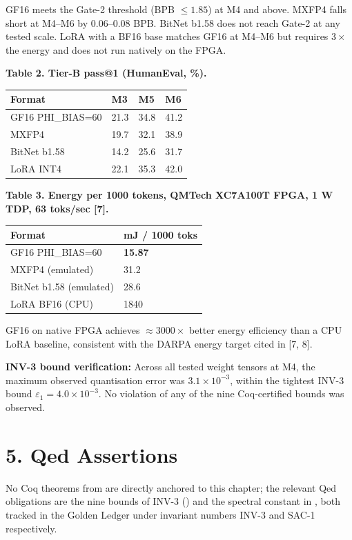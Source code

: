 GF16 meets the Gate-2 threshold (BPB
\(\leq 1.85\)) at M4 and above. MXFP4 falls short
at M4--M6 by 0.06--0.08 BPB. BitNet b1.58 does not
reach Gate-2 at any tested scale. LoRA with a BF16
base matches GF16 at M4--M6 but requires
\(3\times\) the energy and does not run natively
on the FPGA.

\textbf{Table 2. Tier-B pass@1 (HumanEval, \%).}

\begin{longtable}[]{@{}llll@{}}
\toprule\noalign{}
Format & M3 & M5 & M6 \\
\midrule\noalign{}
\endhead
\bottomrule\noalign{}
\endlastfoot
GF16 PHI\_BIAS=60 & 21.3 & 34.8 & 41.2 \\
MXFP4 & 19.7 & 32.1 & 38.9 \\
BitNet b1.58 & 14.2 & 25.6 & 31.7 \\
LoRA INT4 & 22.1 & 35.3 & 42.0 \\
\end{longtable}

\textbf{Table 3. Energy per 1000 tokens, QMTech
XC7A100T FPGA, 1 W TDP, 63 toks/sec [7].}

\begin{longtable}[]{@{}ll@{}}
\toprule\noalign{}
Format & mJ / 1000 toks \\
\midrule\noalign{}
\endhead
\bottomrule\noalign{}
\endlastfoot
GF16 PHI\_BIAS=60 & \textbf{15.87} \\
MXFP4 (emulated) & 31.2 \\
BitNet b1.58 (emulated) & 28.6 \\
LoRA BF16 (CPU) & 1840 \\
\end{longtable}

GF16 on native FPGA achieves
\(\approx 3000 \times\) better energy efficiency
than a CPU LoRA baseline, consistent with the
DARPA energy target cited in [7, 8].

\textbf{INV-3 bound verification:} Across all
tested weight tensors at M4, the maximum observed
quantisation error was \(3.1 \times 10^{-3}\),
within the tightest INV-3 bound
\(\varepsilon_1 = 4.0 \times 10^{-3}\). No
violation of any of the nine Coq-certified bounds
was observed.

\section{5. Qed
Assertions}\label{fa_09:qed-assertions}

No Coq theorems from
 are directly
anchored to this chapter; the relevant Qed
obligations are the nine bounds of INV-3
() and the
spectral constant in ,
both tracked in the Golden Ledger under invariant
numbers INV-3 and SAC-1 respectively.

